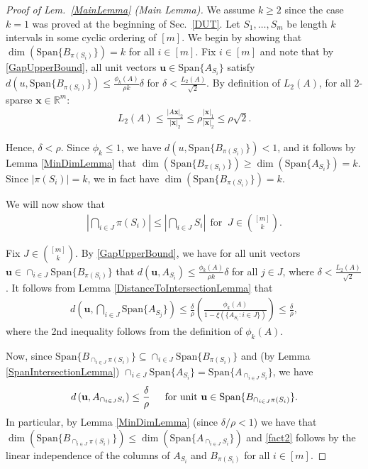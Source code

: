 \documentclass[journal, twocolumn]{IEEEtran}
\begin{document}
\begin{proof}[Proof of Lem.~\ref{MainLemma} (Main Lemma)]
We assume $k \geq 2$ since the case $k = 1$ was proved at the beginning of Sec.~\ref{DUT}. Let $S_1, \ldots, S_m$ be length $k$ intervals in some cyclic ordering of $[m]$. We begin by showing that $\dim(\text{Span}\{B_{\pi(S_i)}\}) = k$ for all $i \in [m]$. 
Fix $i \in [m]$ and note that by \eqref{GapUpperBound}, all unit vectors $\mathbf{u} \in \text{Span}\{A_{S_i}\}$ satisfy $d(u, \text{Span}\{B_{\pi(S_i)}\}) \leq \frac{\phi_k(A)}{\rho k} \delta$ for $\delta < \frac{L_2(A)}{ \sqrt{2}}$. By definition of $L_2(A)$, for all $2$-sparse $\mathbf{x} \in \mathbb{R}^m$:
\begin{align}
L_2(A) \leq \frac{|A\mathbf{x}|_2}{|\mathbf{x}|_2} \leq \rho \frac{|\mathbf{x}|_1}{|\mathbf{x}|_2} \leq \rho \sqrt{2}.
\end{align}

Hence, $\delta < \rho$. Since $\phi_k \leq 1$, we have $d(u, \text{Span}\{B_{\pi(S_i)}\}) < 1$, and it follows by Lemma \ref{MinDimLemma} that $\dim(\text{Span}\{B_{\pi(S_i)}\}) \geq \dim(\text{Span}\{A_{S_i}\}) = k$. Since $|\pi(S_i)| = k$, we in fact have $\dim(\text{Span}\{B_{\pi(S_i)}\}) = k$. %

We will now show that
\begin{align}\label{fact2}
|\bigcap_{i \in J} \pi(S_i)| \leq |\bigcap_{i \in J} S_i | \ \ \text{for } \ J \in {[m] \choose k}.
\end{align}

Fix $J \in {[m] \choose k}$. By \eqref{GapUpperBound}, we have for all unit vectors $\mathbf{u} \in \cap_{i \in J} \text{Span}\{B_{\pi(S_i)}\}$ that $d(\mathbf{u}, A_{S_i}) \leq \frac{\phi_k(A)}{\rho k} \delta$ for all $j \in J$, where $\delta < \frac{L_2(A)}{\sqrt{2}}$. It follows from Lemma \ref{DistanceToIntersectionLemma} that
\begin{align*}
d\left( \mathbf{u}, \bigcap_{i \in J} \text{Span}\{A_{S_j}\} \right) 
\leq \frac{\delta}{\rho} \left( \frac{ \phi_k(A) }{1 - \xi( \{ A_{S_i}: i \in J\} ) } \right) \leq \frac{\delta}{\rho},
\end{align*}
%
where the 2nd inequality follows from the definition of $\phi_k(A)$. 

Now, since \mbox{$\text{Span}\{B_{\cap_{i \in J}\pi(S_i)}\} \subseteq \cap_{i \in J} \text{Span}\{B_{\pi(S_i)}\}$} and (by Lemma \ref{SpanIntersectionLemma}) $\cap_{i \in J}  \text{Span}\{A_{S_i}\} = \text{Span}\{A_{\cap_{i \in J}  S_i}\}$, we have
\begin{align}\label{fact1}
d\left( \mathbf{u}, A_{\cap_{i \in J} S_i} \right) \leq \frac{\delta}{\rho} \indent \text{for unit } \mathbf{u} \in \text{Span}\{B_{\cap_{i \in J}\pi(S_i)}\}.
\end{align}
In particular, by Lemma \ref{MinDimLemma} (since $\delta/\rho < 1$) we have that $\dim(\text{Span}\{B_{\cap_{i \in J}\pi(S_i)}\}) \leq \dim(\text{Span}\{A_{\cap_{i \in J} S_i}\})$ and \eqref{fact2} follows by the linear independence of the columns of $A_{S_i}$ and $B_{\pi(S_i)}$ for all $i \in [m]$.


\end{proof}
\end{document}
